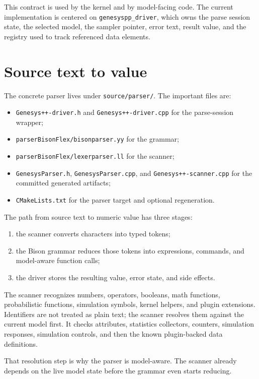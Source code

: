 This contract is used by the kernel and by model-facing code. The current
implementation is centered on \texttt{genesyspp\_driver}, which owns the parse
session state, the selected model, the sampler pointer, error text, result
value, and the registry used to track referenced data elements.

\section{Source text to value}
\label{sec:parser-source-to-value}

The concrete parser lives under \texttt{source/parser/}. The important files
are:
\begin{itemize}
\item \texttt{Genesys++-driver.h} and \texttt{Genesys++-driver.cpp} for the
      parse-session wrapper;
\item \texttt{parserBisonFlex/bisonparser.yy} for the grammar;
\item \texttt{parserBisonFlex/lexerparser.ll} for the scanner;
\item \texttt{GenesysParser.h}, \texttt{GenesysParser.cpp}, and
      \texttt{Genesys++-scanner.cpp} for the committed generated artifacts;
\item \texttt{CMakeLists.txt} for the parser target and optional regeneration.
\end{itemize}

The path from source text to numeric value has three stages:
\begin{enumerate}
\item the scanner converts characters into typed tokens;
\item the Bison grammar reduces those tokens into expressions, commands, and
      model-aware function calls;
\item the driver stores the resulting value, error state, and side effects.
\end{enumerate}

The scanner recognizes numbers, operators, booleans, math functions,
probabilistic functions, simulation symbols, kernel helpers, and plugin
extensions. Identifiers are not treated as plain text; the scanner resolves
them against the current model first. It checks attributes, statistics
collectors, counters, simulation responses, simulation controls, and then the
known plugin-backed data definitions.

That resolution step is why the parser is model-aware. The scanner already
depends on the live model state before the grammar even starts reducing.

